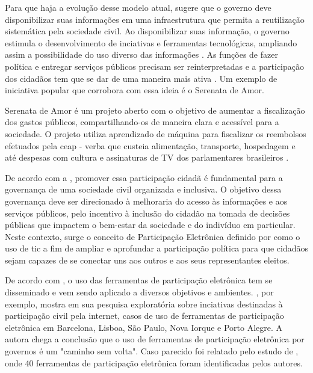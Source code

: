 \par
Para que haja a evolução desse modelo atual,  sugere que o governo deve disponibilizar suas informações em uma infraestrutura que permita a reutilização
sistemática pela sociedade civil. Ao disponibilizar suas informação, o governo estimula o desenvolvimento de inciativas e ferramentas tecnológicas, ampliando assim a possibilidade 
do uso diverso das informações \cite{zuiderwijk2012socio}. As funções de fazer política e entregar serviços públicos precisam ser reinterpretadas e a participação dos cidadãos
tem que se dar de uma maneira mais ativa \cite{bovaird2007beyond}. Um exemplo de iniciativa popular que corrobora com essa ideia é o Serenata de Amor.

\par
Serenata de Amor é um projeto aberto com o objetivo de aumentar a fiscalização dos gastos públicos, compartilhando-os de maneira clara e acessível para a sociedade. O projeto utiliza
aprendizado de máquina para fiscalizar os reembolsos efetuados pela \acrfull{ceap} - verba que custeia alimentação, transporte, hospedagem e até despesas com cultura e 
assinaturas de TV dos parlamentares brasileiros \cite{serenata}. 


\par
De acordo com a , promover essa participação cidadã é fundamental para a governança de uma sociedade civil organizada e inclusiva. O objetivo dessa governança deve
ser direcionado à melhoraria do acesso às informações e aos serviços públicos, pelo incentivo à inclusão do cidadão na tomada de decisões públicas que impactem o bem-estar da 
sociedade e do indivíduo em particular.  Neste contexto, surge o conceito de Participação Eletrônica definido por  como o uso de \acrshort{tic}
a fim de ampliar e aprofundar a participação política para que cidadãos sejam capazes de se conectar uns aos outros e aos seus representantes eleitos. 

\par 
De acordo com , o uso das ferramentas de participação eletrônica tem se disseminado e vem sendo aplicado a diversos objetivos e ambientes. 
, por exemplo, mostra em sua pesquisa exploratória sobre inciativas destinadas à participação civil
pela internet, casos de uso de ferramentas de participação eletrônica em Barcelona, Lisboa, São Paulo, Nova Iorque e Porto Alegre. A autora chega a conclusão 
que o uso de ferramentas de participação eletrônica por governos é um "caminho sem volta". Caso parecido foi relatado pelo estudo de , onde 40 ferramentas
de participação eletrônica foram identificadas pelos autores. 

